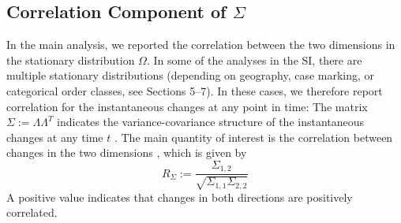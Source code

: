 \documentclass[11pt,a4paper]{article}
\begin{document}
\subsection{Correlation Component of $\Sigma$}\label{sec:instant-corr}
In the main analysis, we reported the correlation between the two dimensions in the stationary distribution $\Omega$.
In some of the analyses in the SI, there are multiple stationary distributions (depending on geography, case marking, or categorical order classes, see Sections 5--7).
In these cases, we therefore report correlation for the instantaneous changes at any point in time:
The matrix $\Sigma := \Lambda\Lambda^T$ indicates the variance-covariance structure of the instantaneous changes at any time $t$ \citep{felsenstein1973maximum, freckleton2012fast}.
The main quantity of interest is the correlation between changes in the two dimensions \citep[cf.][]{felsenstein1973maximum,freckleton2012fast}, which is given by
\begin{equation}
R_\Sigma := \frac{\Sigma_{1,2}}{\sqrt{\Sigma_{1,1}\Sigma_{2,2}}}
\end{equation}
A positive value indicates that changes in both directions are positively correlated.
%
%




\end{document}
